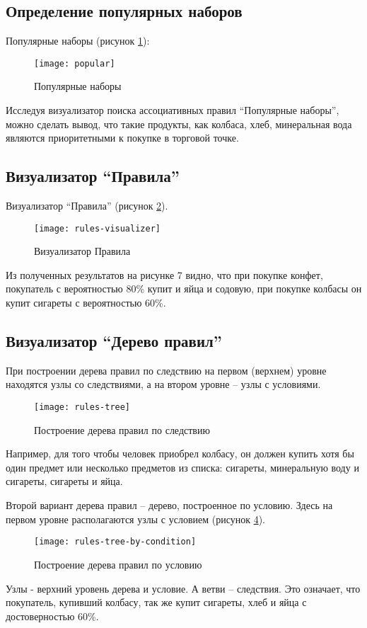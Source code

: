 \documentclass[a4paper,14pt]{extarticle}
\begin{document}
\subsection{Определение популярных наборов}
Популярные наборы (рисунок \ref{fig:popular}):
\begin{figure}[H]
    \centering
    \texttt{[image: popular]}
    \caption{Популярные наборы}
    \label{fig:popular}
\end{figure}
Исследуя визуализатор поиска ассоциативных правил \enquote{Популярные наборы}, можно
сделать вывод, что такие продукты, как колбаса, хлеб, минеральная вода являются
приоритетными к покупке в торговой точке.

\subsection{Визуализатор \enquote{Правила}}
Визуализатор \enquote{Правила} (рисунок \ref{fig:rules-visualizer}).
\begin{figure}[H]
    \centering
    \texttt{[image: rules-visualizer]}
    \caption{Визуализатор Правила}
    \label{fig:rules-visualizer}
\end{figure}
Из полученных результатов на рисунке 7 видно, что при покупке конфет, покупатель
с вероятностью 80\% купит и яйца и содовую, при покупке колбасы он купит сигареты
с вероятностью 60\%.

\subsection{Визуализатор \enquote{Дерево правил}} При построении дерева правил
по следствию на первом (верхнем) уровне находятся узлы со следствиями, а на
втором уровне – узлы с условиями.
\begin{figure}[H]
    \centering
    \texttt{[image: rules-tree]}
    \caption{Построение дерева правил по следствию}
    \label{fig:rules-tree}
\end{figure}
Например, для того чтобы человек приобрел колбасу, он должен купить хотя бы один
предмет или несколько предметов из списка: сигареты, минеральную воду и
сигареты, сигареты и яйца.

Второй вариант дерева правил – дерево, построенное по условию. Здесь на первом
уровне располагаются узлы с условием (рисунок \ref{fig:rules-tree-by-condition}).
\begin{figure}[H]
    \centering
    \texttt{[image: rules-tree-by-condition]}
    \caption{Построение дерева правил по условию}
    \label{fig:rules-tree-by-condition}
\end{figure}
Узлы - верхний уровень дерева и условие. А ветви – следствия. Это означает, что
покупатель, купивший колбасу, так же купит сигареты, хлеб и яйца с
достоверностью 60\%.
\end{document}

